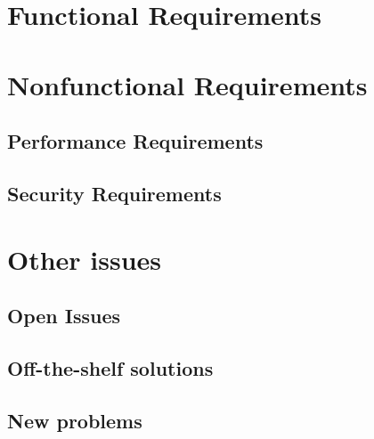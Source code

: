 \documentclass{scrreprt}
\begin{document}
\chapter{Functional Requirements}

\chapter{Nonfunctional Requirements}

\section{Performance Requirements}

\section{Security Requirements}

\chapter{Other issues}

\section{Open Issues}

\section{Off-the-shelf solutions}

\section{New problems}

\nocite{*}
\end{document}

